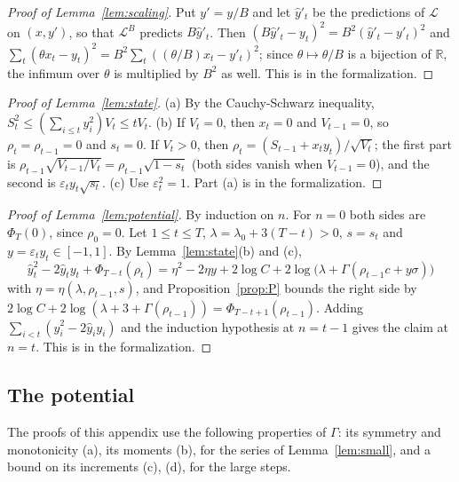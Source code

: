 \documentclass[12pt]{amsart}
\theoremstyle{definition}
\numberwithin{equation}{section}
\newcommand{\R}{\mathbb{R}}
\newcommand{\yh}{\hat y}
\begin{document}
\begin{proof}[Proof of Lemma~\ref{lem:scaling}]
Put $y'=y/B$ and let $\yh'_t$ be the predictions of $\mathcal L$ on $(x,y')$, so that $\mathcal L^B$ predicts $B\yh'_t$. Then $(B\yh'_t-y_t)^2=B^2(\yh'_t-y'_t)^2$ and $\sum_t(\theta x_t-y_t)^2=B^2\sum_t((\theta/B)x_t-y'_t)^2$; since $\theta\mapsto\theta/B$ is a bijection of $\R$, the infimum over $\theta$ is multiplied by $B^2$ as well. This is  in the formalization.
\end{proof}

\begin{proof}[Proof of Lemma~\ref{lem:state}]
(a) By the Cauchy-Schwarz inequality, $S_t^2\le(\sum_{i\le t}y_i^2)V_t\le tV_t$. (b) If $V_t=0$, then $x_t=0$ and $V_{t-1}=0$, so $\rho_t=\rho_{t-1}=0$ and $s_t=0$. If $V_t>0$, then $\rho_t=(S_{t-1}+x_ty_t)/\sqrt{V_t}$; the first part is $\rho_{t-1}\sqrt{V_{t-1}/V_t}=\rho_{t-1}\sqrt{1-s_t}$ (both sides vanish when $V_{t-1}=0$), and the second is $\varepsilon_ty_t\sqrt{s_t}$. (c) Use $\varepsilon_t^2=1$. Part (a) is  in the formalization.
\end{proof}

\begin{proof}[Proof of Lemma~\ref{lem:potential}]
By induction on $n$. For $n=0$ both sides are $\Phi_T(0)$, since $\rho_0=0$. Let $1\le t\le T$, $\lambda=\lambda_0+3(T-t)>0$, $s=s_t$ and $y=\varepsilon_ty_t\in[-1,1]$. By Lemma~\ref{lem:state}(b) and (c),
\[
\yh_t^2-2\yh_ty_t+\Phi_{T-t}(\rho_t)=\eta^2-2\eta y+2\log C+2\log\bigl(\lambda+\Gamma(\rho_{t-1}c+y\sigma)\bigr)
\]
with $\eta=\eta(\lambda,\rho_{t-1},s)$, and Proposition~\ref{prop:P} bounds the right side by $2\log C+2\log(\lambda+3+\Gamma(\rho_{t-1}))=\Phi_{T-t+1}(\rho_{t-1})$. Adding $\sum_{i<t}(\yh_i^2-2\yh_iy_i)$ and the induction hypothesis at $n=t-1$ gives the claim at $n=t$. This is  in the formalization.
\end{proof}

\subsection{The potential}\label{subsec:Gamma}
The proofs of this appendix use the following properties of $\Gamma$: its symmetry and monotonicity (a), its moments (b), for the series of Lemma~\ref{lem:small}, and a bound on its increments (c), (d), for the large steps.
\end{document}
